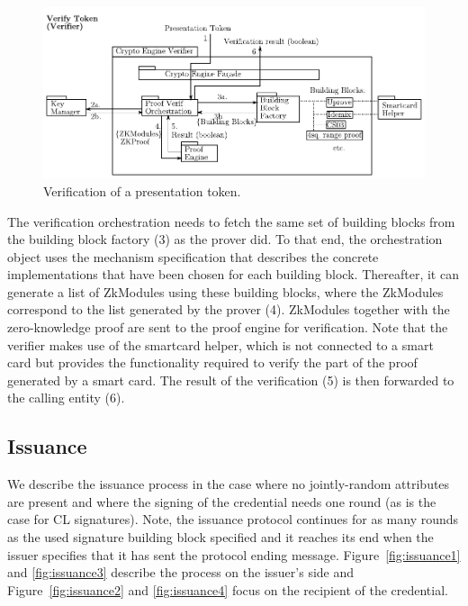 \begin{figure}[htbp]
\includegraphics[width=\textwidth]{img/11.pdf}
\caption{Verification of a presentation token.}
\label{fig:verification}
\end{figure}


The verification orchestration needs to fetch the 
same set of building blocks from the building block factory (3) as the prover did.
To that end, the orchestration object uses the mechanism specification that describes the 
concrete implementations that have been chosen for each building block.
Thereafter, it can 
generate a list of ZkModules using these building blocks, where the ZkModules correspond 
to the list generated by the prover (4).
ZkModules together with the zero-knowledge proof are sent to the proof engine for 
verification.
Note that the verifier makes use of the smartcard helper, which is not connected to a smart card
but provides the functionality required to verify the part of the proof generated by a smart card.
The result of the verification (5) is then forwarded to the calling entity (6).





\subsection{Issuance}
\label{sec:arch:issuance}

We describe the issuance process in the case where no jointly-random attributes are present
and where the signing of the credential needs one round (as is the case for CL signatures).
%
Note, the issuance protocol continues for as many rounds as the used signature building block
specified and it reaches its end when the issuer specifies that it has sent the protocol 
ending message. 
%
Figure~\ref{fig:issuance1} and \ref{fig:issuance3} describe the process on the issuer's side
and Figure~\ref{fig:issuance2} and \ref{fig:issuance4} focus on the recipient of the 
credential.



